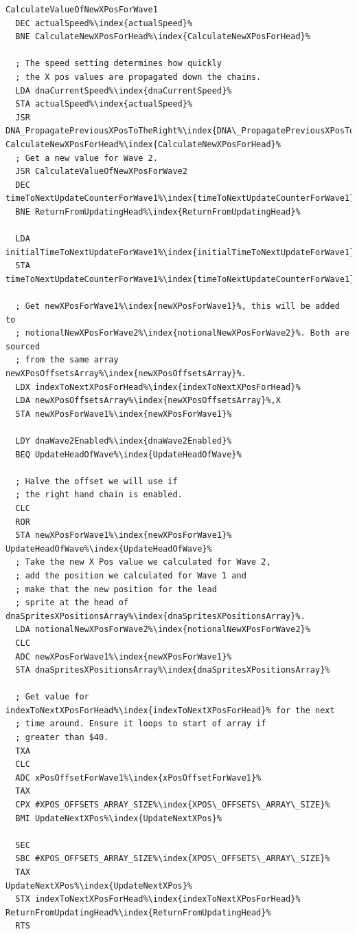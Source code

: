 \hspace{0.5cm}
\begin{minipage}[b]{0.50\linewidth}
\centering
  \begin{lstlisting}[escapechar=\%,basicstyle=\tiny\ttfamily, caption=Calculate the new X Pos value for the head sprites\index{sprites}\, as well as propagate the
  values in \icode{dnaXPosDataHeadArray} to the right when required.]
CalculateValueOfNewXPosForWave1
  DEC actualSpeed%\index{actualSpeed}%
  BNE CalculateNewXPosForHead%\index{CalculateNewXPosForHead}%

  ; The speed setting determines how quickly 
  ; the X pos values are propagated down the chains.
  LDA dnaCurrentSpeed%\index{dnaCurrentSpeed}%
  STA actualSpeed%\index{actualSpeed}%
  JSR DNA_PropagatePreviousXPosToTheRight%\index{DNA\_PropagatePreviousXPosToTheRight}%
CalculateNewXPosForHead%\index{CalculateNewXPosForHead}%   
  ; Get a new value for Wave 2.
  JSR CalculateValueOfNewXPosForWave2
  DEC timeToNextUpdateCounterForWave1%\index{timeToNextUpdateCounterForWave1}%
  BNE ReturnFromUpdatingHead%\index{ReturnFromUpdatingHead}%

  LDA initialTimeToNextUpdateForWave1%\index{initialTimeToNextUpdateForWave1}%
  STA timeToNextUpdateCounterForWave1%\index{timeToNextUpdateCounterForWave1}%

  ; Get newXPosForWave1%\index{newXPosForWave1}%, this will be added to
  ; notionalNewXPosForWave2%\index{notionalNewXPosForWave2}%. Both are sourced
  ; from the same array newXPosOffsetsArray%\index{newXPosOffsetsArray}%.
  LDX indexToNextXPosForHead%\index{indexToNextXPosForHead}%
  LDA newXPosOffsetsArray%\index{newXPosOffsetsArray}%,X
  STA newXPosForWave1%\index{newXPosForWave1}%

  LDY dnaWave2Enabled%\index{dnaWave2Enabled}%
  BEQ UpdateHeadOfWave%\index{UpdateHeadOfWave}%

  ; Halve the offset we will use if
  ; the right hand chain is enabled.
  CLC
  ROR 
  STA newXPosForWave1%\index{newXPosForWave1}%
UpdateHeadOfWave%\index{UpdateHeadOfWave}%   
  ; Take the new X Pos value we calculated for Wave 2,
  ; add the position we calculated for Wave 1 and 
  ; make that the new position for the lead
  ; sprite at the head of dnaSpritesXPositionsArray%\index{dnaSpritesXPositionsArray}%.
  LDA notionalNewXPosForWave2%\index{notionalNewXPosForWave2}%
  CLC
  ADC newXPosForWave1%\index{newXPosForWave1}%
  STA dnaSpritesXPositionsArray%\index{dnaSpritesXPositionsArray}%

  ; Get value for indexToNextXPosForHead%\index{indexToNextXPosForHead}% for the next
  ; time around. Ensure it loops to start of array if 
  ; greater than $40.
  TXA
  CLC
  ADC xPosOffsetForWave1%\index{xPosOffsetForWave1}%
  TAX
  CPX #XPOS_OFFSETS_ARRAY_SIZE%\index{XPOS\_OFFSETS\_ARRAY\_SIZE}%
  BMI UpdateNextXPos%\index{UpdateNextXPos}%

  SEC
  SBC #XPOS_OFFSETS_ARRAY_SIZE%\index{XPOS\_OFFSETS\_ARRAY\_SIZE}%
  TAX
UpdateNextXPos%\index{UpdateNextXPos}%   
  STX indexToNextXPosForHead%\index{indexToNextXPosForHead}%
ReturnFromUpdatingHead%\index{ReturnFromUpdatingHead}%   
  RTS
\end{lstlisting}
\end{minipage}


